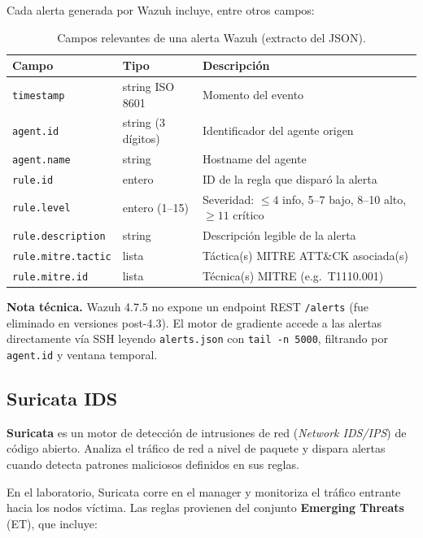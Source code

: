 \documentclass[12pt,a4paper]{article}
\begin{document}
Cada alerta generada por Wazuh incluye, entre otros campos:

\begin{table}[H]
  \centering
  \caption{Campos relevantes de una alerta Wazuh (extracto del JSON).}
  \begin{tabular}{@{}lll@{}}
    \toprule
    Campo & Tipo & Descripción \\
    \midrule
    \texttt{timestamp}       & string ISO 8601 & Momento del evento \\
    \texttt{agent.id}        & string (3 dígitos) & Identificador del agente origen \\
    \texttt{agent.name}      & string & Hostname del agente \\
    \texttt{rule.id}         & entero & ID de la regla que disparó la alerta \\
    \texttt{rule.level}      & entero (1--15) & Severidad: $\leq 4$ info, 5--7 bajo, 8--10 alto, $\geq 11$ crítico \\
    \texttt{rule.description}& string & Descripción legible de la alerta \\
    \texttt{rule.mitre.tactic} & lista & Táctica(s) MITRE ATT\&CK asociada(s) \\
    \texttt{rule.mitre.id}   & lista & Técnica(s) MITRE (e.g.\ T1110.001) \\
    \bottomrule
  \end{tabular}
\end{table}

\begin{tcolorbox}[defbox]
  \textbf{Nota técnica.} Wazuh 4.7.5 no expone un endpoint REST
  \texttt{/alerts} (fue eliminado en versiones post-4.3). El motor de
  gradiente accede a las alertas directamente vía SSH leyendo
  \texttt{alerts.json} con \texttt{tail -n 5000}, filtrando por
  \texttt{agent.id} y ventana temporal.
\end{tcolorbox}

\subsection{Suricata IDS}

\textbf{Suricata} es un motor de detección de intrusiones de red
(\emph{Network IDS/IPS}) de código abierto. Analiza el tráfico de red
a nivel de paquete y dispara alertas cuando detecta patrones maliciosos
definidos en sus reglas.

En el laboratorio, Suricata corre en el manager y monitoriza el tráfico
entrante hacia los nodos víctima. Las reglas provienen del conjunto
\textbf{Emerging Threats} (ET), que incluye:
\end{document}
